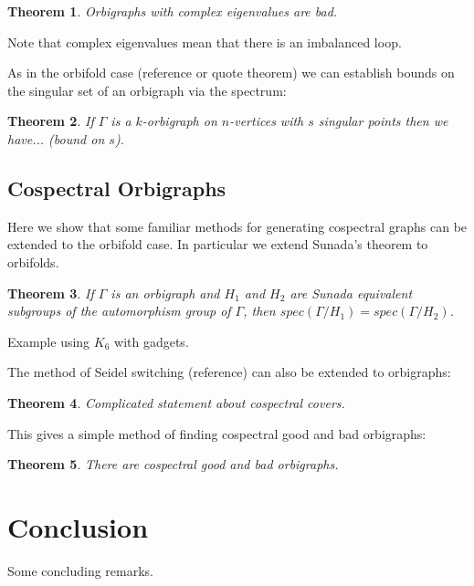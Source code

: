 \documentclass[12pt]{article}
\theoremstyle{plain}
\newtheorem{theorem}{Theorem}
\theoremstyle{definition}
\theoremstyle{remark}
\begin{document}
\begin{theorem}
Orbigraphs with complex eigenvalues are bad.
\end{theorem}

Note that complex eigenvalues mean that there is an imbalanced loop.

As in the orbifold case (reference or quote theorem) we can establish bounds on the singular set of an orbigraph via the spectrum:

\begin{theorem}
If $\Gamma$ is a $k$-orbigraph on $n$-vertices with $s$ singular points then we have... (bound on $s$).
\end{theorem}

\subsection{Cospectral Orbigraphs}

Here we show that some familiar methods for generating cospectral graphs can be extended to the orbifold case. In particular we extend Sunada's theorem to orbifolds.

\begin{theorem}
If $\Gamma$ is an orbigraph and $H_1$ and $H_2$ are Sunada equivalent subgroups of the automorphism group of $\Gamma$, then $spec(\Gamma / H_1) = spec(\Gamma / H_2)$.
\end{theorem}

Example using $K_6$ with gadgets.

The method of Seidel switching (reference) can also be extended to orbigraphs:

\begin{theorem}
Complicated statement about cospectral covers.
\end{theorem}

This gives a simple method of finding cospectral good and bad orbigraphs:

\begin{theorem}
There are cospectral good and bad orbigraphs.
\end{theorem}


\section{Conclusion}
Some concluding remarks.


\end{document}
